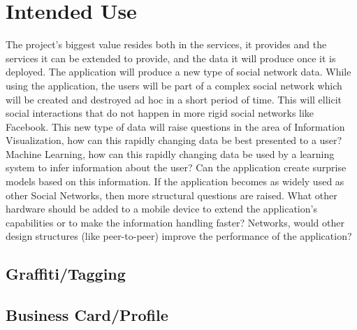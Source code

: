 \documentclass[11pt]{article}
\begin{document}
\section{Intended Use}



{\color{red} 
The project's biggest value resides both in the services, it provides and the services it can be extended to provide, and the data it will produce once it is deployed. The application will produce a new type of social network data. While using the application, the users will be part of a complex social network which will be created and destroyed ad hoc in a short period of time. This will ellicit social interactions that do not happen in more rigid social networks like Facebook. This new type of data will raise questions in the area of Information Visualization, how can this rapidly changing data be best presented to a user? Machine Learning, how can this rapidly changing data be used by a learning system to infer information about the user? Can the application create surprise models based on this information. If the application becomes as widely used as other Social Networks, then more structural questions are raised. What other hardware should be added to a mobile device to extend the application's capabilities or to make the information handling faster? Networks, would other design structures (like peer-to-peer) improve the performance of the application?
}

\subsection{Graffiti/Tagging}

\subsection{Business Card/Profile}
\end{document}
